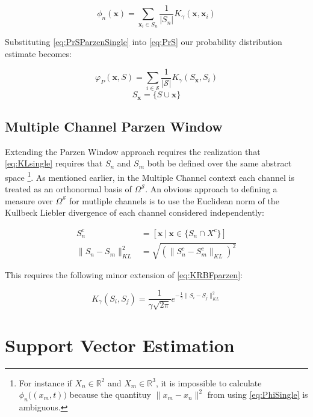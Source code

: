 \documentclass[10pt]{article}
\begin{document}
\begin{equation} \label{eq:PhiSingle}
\phi_n( \mathbf{x} ) = \sum_{\mathbf{x}_i \in S_n} \frac{1}{|S_n|}  K_\gamma (\mathbf{x}, \mathbf{x}_i ) 
\end{equation}

Substituting \ref{eq:PrSParzenSingle} into \ref{eq:PrS} our probability distribution estimate becomes:

\begin{equation} \label{eq:VarphiParzenSingle}
\varphi_P(\mathbf{x}, S) = \sum_{i \in \mathcal{S}} \frac{1}{|\mathcal{S}|} K_\gamma ( S_{\mathbf{x}}, S_i )
\end{equation}
\[ S_{\mathbf{x}} = \{ S \cup \mathbf{x} \}\]


\subsection{ Multiple Channel Parzen Window}

Extending the Parzen Window approach requires the realization that \ref{eq:KLsingle} requires that \( S_n \) and \( S_m \) both be defined over the same abstract space \footnote{ For instance if \( X_n \in \mathbb{R}^2 \) and \( X_m \in \mathbb{R}^3 \), it is impossible to calculate \( \phi_n\big( (x_m,t) \big) \) because the quantituy \( \| x_m - x_n \|^2 \) from using \ref{eq:PhiSingle} is ambiguous.}.  As mentioned earlier, in the Multiple Channel context each channel is treated as an orthonormal basis of \( \Omega^\mathcal{S} \).  An obvious approach to defining a measure over \( \Omega^\mathcal{S} \) for mutliple channels is to use the Euclidean norm of the Kullbeck Liebler divergence of each channel considered independently:

\begin{align} 
S_n^c &= [ \mathbf{x} \ | \ \mathbf{x} \in \{ S_n \cap X^c \} ] \nonumber \\
\| S_n - S_m \|_{KL}^2 &= \sqrt{ (\|S_n^c - S_m^c\|_{KL})^2 } \label{eq:NormMultiple}
\end{align}

This requires the following minor extension of \ref{eq:KRBFparzen}:

\begin{equation} \label{eq:KRBFParzenMultiple}
K_\gamma( S_i, S_j ) =  \frac{1}{\gamma \sqrt{2\pi} } e^{-\frac{1}{\gamma} \|S_i - S_j \|_{KL}^2 }
\end{equation}


\section{ Support Vector Estimation}
\end{document}
